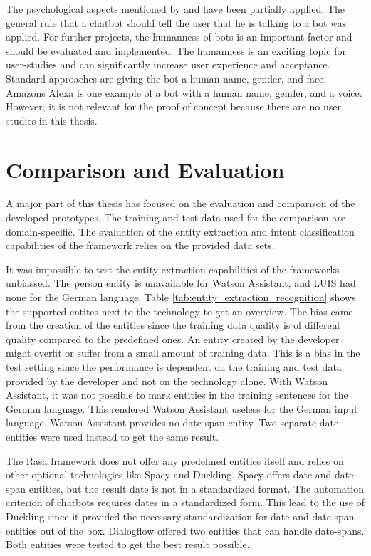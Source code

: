 The psychological aspects mentioned by \citet{folstad2017chatbots, brandtzaeg2018chatbots} and \citet{GO2019304} have been partially applied.
The general rule that a chatbot should tell the user that he is talking to a bot was applied.
For further projects, the humanness of bots is an important factor and should be evaluated and implemented.
The humanness is an exciting topic for user-studies and can significantly increase user experience and acceptance.
Standard approaches are giving the bot a human name, gender, and face.
Amazons Alexa is one example of a bot with a human name, gender, and a voice.
However, it is not relevant for the proof of concept because there are no user studies in this thesis.


\section{Comparison and Evaluation}\label{sec:comparison_and_eval}
A major part of this thesis has focused on the evaluation and comparison of the developed prototypes.
The training and test data used for the comparison are domain-specific. 
The evaluation of the entity extraction and intent classification capabilities of the framework relies on the provided data sets.

It was impossible to test the entity extraction capabilities of the frameworks unbiassed.
The person entity is unavailable for Watson Assistant, and LUIS had none for the German language.
Table \ref{tab:entity_extraction_recognition} shows the supported entites next to the technology to get an overview.
The bias came from the creation of the entities since the training data quality is of different quality compared to the predefined ones.
An entity created by the developer might overfit or suffer from a small amount of training data.
This is a bias in the test setting since the performance is dependent on the training and test data provided by the developer and not on the technology alone.
With Watson Assistant, it was not possible to mark entities in the training sentences for the German language.
This rendered Watson Assistant useless for the German input language.
Watson Assistant provides no date span entity.
Two separate date entities were used instead to get the same result.
  
The Rasa framework does not offer any predefined entities itself and relies on other optional technologies like Spacy and Duckling.
Spacy offers date and date-span entities, but the result date is not in a standardized format.
The automation criterion of chatbots requires dates in a standardized form.
This lead to the use of Duckling since it provided the necessary standardization for date and date-span entities out of the box.
Dialogflow offered two entities that can handle date-spans.
Both entities were tested to get the best result possible. 

